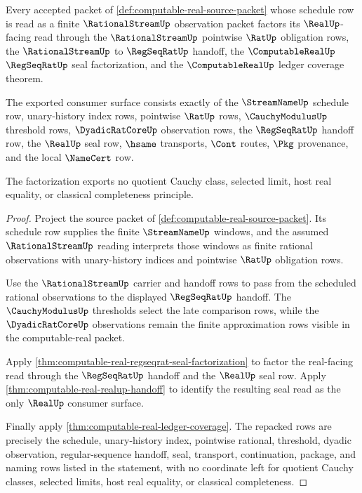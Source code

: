 \begin{theorem}
\label{thm:computable-real-rationalstream-regseqrat-schedule-factorization}
Every accepted packet of
\autoref{def:computable-real-source-packet} whose schedule row is read as a
finite $\RationalStreamUp$ observation packet factors its $\RealUp$-facing
read through the $\RationalStreamUp$ pointwise $\RatUp$ obligation rows, the
$\RationalStreamUp$ to $\RegSeqRatUp$ handoff, the
$\ComputableRealUp$ $\RegSeqRatUp$ seal factorization, and the
$\ComputableRealUp$ ledger coverage theorem.

The exported consumer surface consists exactly of the $\StreamNameUp$
schedule row, unary-history index rows, pointwise $\RatUp$ rows,
$\CauchyModulusUp$ threshold rows, $\DyadicRatCoreUp$ observation rows, the
$\RegSeqRatUp$ handoff row, the $\RealUp$ seal row, $\hsame$ transports,
$\Cont$ routes, $\Pkg$ provenance, and the local $\NameCert$ row.

The factorization exports no quotient Cauchy class, selected limit, host real
equality, or classical completeness principle.
\end{theorem}
\begin{proof}
Project the source packet of
\autoref{def:computable-real-source-packet}. Its schedule row supplies the
finite $\StreamNameUp$ windows, and the assumed $\RationalStreamUp$ reading
interprets those windows as finite rational observations with unary-history
indices and pointwise $\RatUp$ obligation rows.

Use the $\RationalStreamUp$ carrier and handoff rows to pass from the
scheduled rational observations to the displayed $\RegSeqRatUp$ handoff. The
$\CauchyModulusUp$ thresholds select the late comparison rows, while the
$\DyadicRatCoreUp$ observations remain the finite approximation rows visible
in the computable-real packet.

Apply
\autoref{thm:computable-real-regseqrat-seal-factorization} to factor the
real-facing read through the $\RegSeqRatUp$ handoff and the $\RealUp$ seal
row. Apply \autoref{thm:computable-real-realup-handoff} to identify the
resulting seal read as the only $\RealUp$ consumer surface.

Finally apply \autoref{thm:computable-real-ledger-coverage}. The repacked
rows are precisely the schedule, unary-history index, pointwise rational,
threshold, dyadic observation, regular-sequence handoff, seal, transport,
continuation, package, and naming rows listed in the statement, with no
coordinate left for quotient Cauchy classes, selected limits, host real
equality, or classical completeness.
\end{proof}

